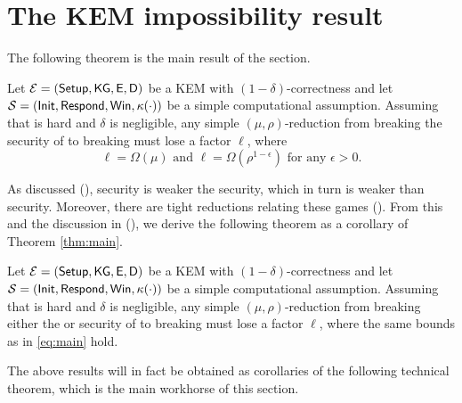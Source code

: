 
\section{The KEM impossibility result}

The following theorem is the main result of the section.

\begin{theorem}\label{thm:main}
  Let \(\mathcal{E} = (\mathsf{Setup}, \mathsf{KG}, \mathsf{E}, \mathsf{D})\) be a KEM
  with \((1-\delta)\)-correctness
  and let \(\mathcal{S} = (\mathsf{Init}, \mathsf{Respond}, \mathsf{Win},\kappa(\cdot))\)
  be a simple computational assumption.
  Assuming that \Simple is hard
  and \(\delta\) is negligible,
  any simple \((\mu,\rho)\)-reduction \redR
  from breaking the \OWECPA security of \KEM to breaking \Simple
  must lose a factor \(\ell\), where
  \begin{equation}\label{eq:main}
    \ell = \Omega(\mu) \text{ and } \ell = \Omega(\rho^{1-\epsilon}) \text{ for any } \epsilon > 0.
  \end{equation}
\end{theorem}

As discussed (), \OWECPA security is weaker the \INDECPA security,
which in turn is weaker than \INDECCA security.
Moreover, there are tight reductions relating these games
().
From this and the discussion in (),
we derive the following theorem as a corollary of Theorem \ref{thm:main}.

\begin{theorem}
  Let \(\mathcal{E} = (\mathsf{Setup}, \mathsf{KG}, \mathsf{E}, \mathsf{D})\) be a KEM
  with \((1-\delta)\)-correctness
  and let \(\mathcal{S} = (\mathsf{Init}, \mathsf{Respond}, \mathsf{Win},\kappa(\cdot))\)
  be a simple computational assumption.
  Assuming that \Simple is hard
  and \(\delta\) is negligible,
  any simple \((\mu,\rho)\)-reduction \redR
  from breaking either the \INDECPA or \INDECCA security of \KEM to breaking \Simple
  must lose a factor \(\ell\),
  where the same bounds as in \eqref{eq:main} hold.
\end{theorem}

The above results will in fact be obtained as corollaries
of the following technical theorem, which is the main workhorse of this section.

